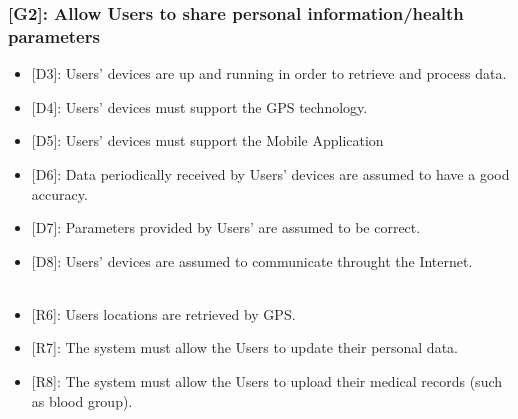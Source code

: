 \documentclass[12pt,a4paper]{article}
\begin{document}
		\subsubsection*{{[}{G2}{]}: Allow Users to share personal information/health parameters}
			\begin{itemize}
				\begin{itemize}
					\item {[D3]}: Users' devices are up and running in order to retrieve and process data.
					\item {[D4]}: Users' devices must support the GPS technology.
					\item {[D5]}: Users' devices must support the Mobile Application
					\item {[D6]}: Data periodically received by Users' devices are assumed to have a good accuracy. 
					\item {[D7]}: Parameters provided by Users' are assumed to be correct. 
					\item {[D8]}: Users' devices are assumed to communicate throught the Internet.
					\\ \\
					\item {[R6]}: Users locations are retrieved by GPS.
					\item {[R7]}: The system must allow the Users to update their personal data.
					\item {[R8]}: The system must allow the Users to upload their medical records (such as blood group).
				\end{itemize} 
			\end{itemize}
\end{document}
